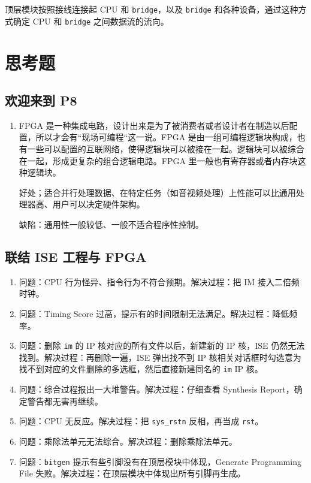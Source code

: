 \documentclass[12pt,AutoFakeBold,AutoFakeSlant]{article}
\providecommand{\tightlist}{%
  \setlength{\itemsep}{0pt}\setlength{\parskip}{0pt}}
\newcommand{\ms}[1]{\texttt{#1}}
\begin{document}
顶层模块按照接线连接起 CPU 和 \texttt{bridge}，以及 \ms{bridge} 和各种设备，通过这种方式确定 CPU 和
\texttt{bridge} 之间数据流的流向。

\section{思考题}

\subsection{欢迎来到 P8}

\begin{enumerate}
\item FPGA 是一种集成电路，设计出来是为了被消费者或者设计者在制造以后配置，所以才会有“现场可编程“这一说。FPGA 是由一组可编程逻辑块构成，也有一些可以配置的互联网络，使得逻辑块可以被接在一起。逻辑块可以被综合在一起，形成更复杂的组合逻辑电路。FPGA 里一般也有寄存器或者内存块这种逻辑块。

好处；适合并行处理数据、在特定任务（如音视频处理）上性能可以比通用处理器高、用户可以决定硬件架构。

缺陷：通用性一般较低、一般不适合程序性控制。
\end{enumerate}

\subsection{联结 ISE 工程与 FPGA}

\begin{enumerate}
\tightlist
\item
问题：CPU 行为怪异、指令行为不符合预期。解决过程：把 IM 接入二倍频时钟。
\item
问题：Timing Score 过高，提示有的时间限制无法满足。解决过程：降低频率。
\item
问题：删除 \ms{im} 的 IP 核对应的所有文件以后，新建新的 IP 核，ISE 仍然无法找到。解决过程：再删除一遍，ISE 弹出找不到 IP 核相关对话框时勾选意为找不到对应的文件删除的多选框，然后直接新建同名的 \ms{im} IP 核。
\item
问题：综合过程报出一大堆警告。解决过程：仔细查看 Synthesis Report，确定警告都无害再继续。
\item
问题：CPU 无反应。解决过程：把 \ms{sys\_rstn} 反相，再当成 \ms{rst}。
\item
问题：乘除法单元无法综合。解决过程：删除乘除法单元。
\item
问题：\ms{bitgen} 提示有些引脚没有在顶层模块中体现，Generate Programming File 失败。解决过程：在顶层模块中体现出所有引脚再生成。
\end{enumerate}
\end{document}
